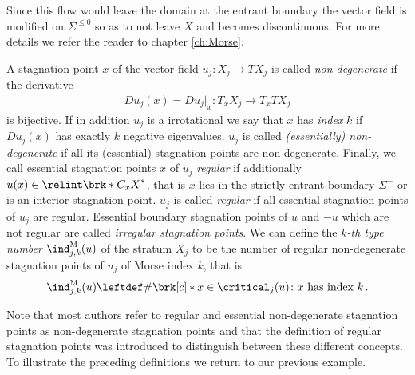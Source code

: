Since this flow would leave the domain at the entrant boundary the vector field is modified on $\Sigma^{\leq0}$ 
so as to not leave $X$ and becomes discontinuous.
For more details we refer the reader to chapter \ref{ch:Morse}.
\begin{definition}\label{df:nonDegeneracy}
  A stagnation point $x$ of the vector field $u_j\colon X_j\to TX_j$ is called
  \emph{non-degenerate} if the derivative 
  \begin{align*}
    Du_j(x)=Du_j\big\vert_x\colon T_xX_j\to T_xTX_j
  \end{align*}
  is bijective.
  If in addition $u_j$ is a irrotational we say that $x$ has \emph{index} $k$
  if $Du_j(x)$ has exactly $k$ negative eigenvalues.
  $u_j$ is called \emph{(essentially) non-degenerate} if all its (essential) stagnation points
  are non-degenerate.
  Finally, we call essential stagnation points $x$ of $u_j$ \emph{regular} if additionally $u(x)\in\relint \brk*{C_xX}^*$,
  that is $x$ lies in the strictly entrant boundary $\Sigma^-$ or is an interior stagnation point.
  $u_j$ is called \emph{regular} if all essential stagnation points of $u_j$ are regular.
  Essential boundary stagnation points of $u$ and $-u$ which are not regular are called \emph{irregular stagnation points}.
  We can define the \emph{$k$-th type number} $\ind^\text{M}_{j,k}(u)$ of the
  stratum $X_j$ to be the number of regular non-degenerate stagnation points of $u_j$ of Morse index $k$,
  that is
  \begin{align}
    \ind^\text{M}_{j,k}(u)\leftdef\#\brk[c]*{x\in\critical_j(u)\colon x\text{ has index }k}\,.\label{eq:def_typenbr_strata}
  \end{align}
\end{definition}
Note that most authors refer to regular and essential non-degenerate stagnation points as non-degenerate stagnation points
and that the definition of regular stagnation points was introduced to distinguish between these different concepts.
To illustrate the preceding definitions we return to our previous example.

